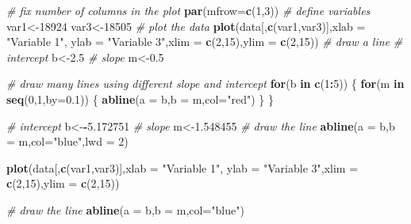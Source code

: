 \documentclass[
]{book}
\newenvironment{Shaded}{\begin{snugshade}}{\end{snugshade}}
\newcommand{\CommentTok}[1]{\textcolor[rgb]{0.56,0.35,0.01}{\textit{#1}}}
\newcommand{\ControlFlowTok}[1]{\textcolor[rgb]{0.13,0.29,0.53}{\textbf{#1}}}
\newcommand{\DataTypeTok}[1]{\textcolor[rgb]{0.13,0.29,0.53}{#1}}
\newcommand{\DecValTok}[1]{\textcolor[rgb]{0.00,0.00,0.81}{#1}}
\newcommand{\FloatTok}[1]{\textcolor[rgb]{0.00,0.00,0.81}{#1}}
\newcommand{\KeywordTok}[1]{\textcolor[rgb]{0.13,0.29,0.53}{\textbf{#1}}}
\newcommand{\NormalTok}[1]{#1}
\newcommand{\OperatorTok}[1]{\textcolor[rgb]{0.81,0.36,0.00}{\textbf{#1}}}
\newcommand{\StringTok}[1]{\textcolor[rgb]{0.31,0.60,0.02}{#1}}
\theoremstyle{definition}
\theoremstyle{definition}
\theoremstyle{definition}
\theoremstyle{remark}
\begin{document}
\begin{Shaded}
\begin{Highlighting}[]
\CommentTok{# fix number of columns in the plot}
\KeywordTok{par}\NormalTok{(}\DataTypeTok{mfrow=}\KeywordTok{c}\NormalTok{(}\DecValTok{1}\NormalTok{,}\DecValTok{3}\NormalTok{))}
\CommentTok{# define variables}
\NormalTok{var1<-}\DecValTok{18924}
\NormalTok{var3<-}\DecValTok{18505}
\CommentTok{# plot the data}
\KeywordTok{plot}\NormalTok{(data[,}\KeywordTok{c}\NormalTok{(var1,var3)],}\DataTypeTok{xlab =} \StringTok{"Variable 1"}\NormalTok{, }\DataTypeTok{ylab =} \StringTok{"Variable 3"}\NormalTok{,}\DataTypeTok{xlim =} \KeywordTok{c}\NormalTok{(}\DecValTok{2}\NormalTok{,}\DecValTok{15}\NormalTok{),}\DataTypeTok{ylim =} \KeywordTok{c}\NormalTok{(}\DecValTok{2}\NormalTok{,}\DecValTok{15}\NormalTok{))}
\CommentTok{# draw a line}
\CommentTok{# intercept}
\NormalTok{b<-}\FloatTok{2.5}
\CommentTok{# slope}
\NormalTok{m<-}\FloatTok{0.5}

\CommentTok{# draw many lines using different slope and intercept}
\ControlFlowTok{for}\NormalTok{(b }\ControlFlowTok{in} \KeywordTok{c}\NormalTok{(}\DecValTok{1}\OperatorTok{:}\DecValTok{5}\NormalTok{))}
\NormalTok{\{}
  \ControlFlowTok{for}\NormalTok{(m }\ControlFlowTok{in} \KeywordTok{seq}\NormalTok{(}\DecValTok{0}\NormalTok{,}\DecValTok{1}\NormalTok{,}\DataTypeTok{by=}\FloatTok{0.1}\NormalTok{))}
\NormalTok{  \{}
    \KeywordTok{abline}\NormalTok{(}\DataTypeTok{a =}\NormalTok{ b,}\DataTypeTok{b =}\NormalTok{ m,}\DataTypeTok{col=}\StringTok{"red"}\NormalTok{)}
\NormalTok{  \}}
\NormalTok{\}}

\CommentTok{# intercept}
\NormalTok{b<-}\OperatorTok{-}\FloatTok{5.172751}
\CommentTok{# slope}
\NormalTok{m<-}\FloatTok{1.548455}
\CommentTok{# draw the line}
\KeywordTok{abline}\NormalTok{(}\DataTypeTok{a =}\NormalTok{ b,}\DataTypeTok{b =}\NormalTok{ m,}\DataTypeTok{col=}\StringTok{"blue"}\NormalTok{,}\DataTypeTok{lwd =} \DecValTok{2}\NormalTok{)}


\KeywordTok{plot}\NormalTok{(data[,}\KeywordTok{c}\NormalTok{(var1,var3)],}\DataTypeTok{xlab =} \StringTok{"Variable 1"}\NormalTok{, }\DataTypeTok{ylab =} \StringTok{"Variable 3"}\NormalTok{,}\DataTypeTok{xlim =} \KeywordTok{c}\NormalTok{(}\DecValTok{2}\NormalTok{,}\DecValTok{15}\NormalTok{),}\DataTypeTok{ylim =} \KeywordTok{c}\NormalTok{(}\DecValTok{2}\NormalTok{,}\DecValTok{15}\NormalTok{))}

\CommentTok{# draw the line}
\KeywordTok{abline}\NormalTok{(}\DataTypeTok{a =}\NormalTok{ b,}\DataTypeTok{b =}\NormalTok{ m,}\DataTypeTok{col=}\StringTok{"blue"}\NormalTok{)}



\end{Highlighting}
\end{Shaded}
\end{document}
